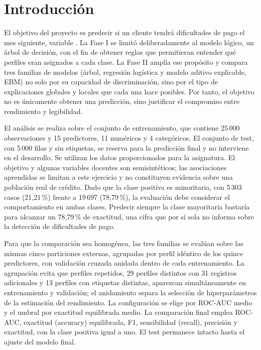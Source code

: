 \section{Introducción}\label{sec:intro}

El objetivo del proyecto es predecir si un cliente tendrá dificultades de pago el mes siguiente, variable . La Fase I se limitó deliberadamente al modelo lógico, un árbol de decisión, con el fin de obtener reglas que permitieran entender qué perfiles eran asignados a cada clase. La Fase II amplía ese propósito y compara tres familias de modelos (árbol, regresión logística y modelo aditivo explicable, EBM) no solo por su capacidad de discriminación, sino por el tipo de explicaciones globales y locales que cada una hace posibles. Por tanto, el objetivo no es únicamente obtener una predicción, sino justificar el compromiso entre rendimiento y legibilidad.

El análisis se realiza sobre el conjunto de entrenamiento, que contiene 25\,000 observaciones y 15 predictores, 11 numéricos y 4 categóricos. El conjunto de test, con 5\,000 filas y sin etiquetas, se reserva para la predicción final y no interviene en el desarrollo. Se utilizan los datos proporcionados para la asignatura. El objetivo y algunas variables docentes son semisintéticos; las asociaciones aprendidas se limitan a este ejercicio y no constituyen evidencia sobre una población real de crédito. Dado que la clase positiva es minoritaria, con 5\,303 casos (21,21\,\%) frente a 19\,697 (78,79\,\%), la evaluación debe considerar el comportamiento en ambas clases. Predecir siempre la clase mayoritaria bastaría para alcanzar un 78,79\,\% de exactitud, una cifra que por sí sola no informa sobre la detección de dificultades de pago.

Para que la comparación sea homogénea, las tres familias se evalúan sobre las mismas cinco particiones externas, agrupadas por perfil idéntico de los quince predictores, con validación cruzada anidada dentro de cada entrenamiento. La agrupación evita que perfiles repetidos, 29 perfiles distintos con 31 registros adicionales y 13 perfiles con etiquetas distintas, aparezcan simultáneamente en entrenamiento y validación; el anidamiento separa la selección de hiperparámetros de la estimación del rendimiento. La configuración se elige por ROC-AUC medio y el umbral por exactitud equilibrada medio. La comparación final emplea ROC-AUC, exactitud (accuracy) equilibrada, F1, sensibilidad (recall), precisión y exactitud, con la clase positiva igual a uno. El test permanece intacto hasta el ajuste del modelo final.

